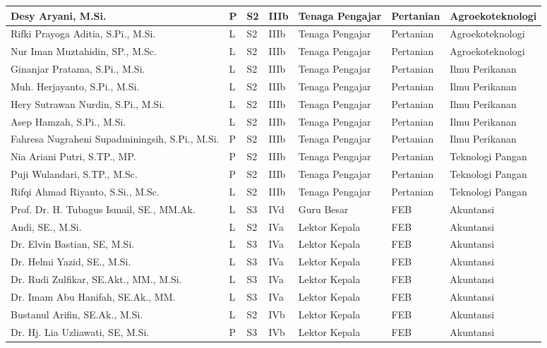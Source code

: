 \documentclass[
]{book}
\begin{document}
\begin{longtable}{l|l|l|l|l|l|l}
\hline
Desy Aryani, M.Si. & P & S2 & IIIb & Tenaga Pengajar & Pertanian & Agroekoteknologi\\
\hline
Rifki Prayoga Aditia, S.Pi., M.Si. & L & S2 & IIIb & Tenaga Pengajar & Pertanian & Agroekoteknologi\\
\hline
Nur Iman Muztahidin, SP., M.Sc. & L & S2 & IIIb & Tenaga Pengajar & Pertanian & Agroekoteknologi\\
\hline
Ginanjar Pratama, S.Pi., M.Si. & L & S2 & IIIb & Tenaga Pengajar & Pertanian & Ilmu Perikanan\\
\hline
Muh. Herjayanto, S.Pi., M.Si. & L & S2 & IIIb & Tenaga Pengajar & Pertanian & Ilmu Perikanan\\
\hline
Hery Sutrawan Nurdin, S.Pi., M.Si. & L & S2 & IIIb & Tenaga Pengajar & Pertanian & Ilmu Perikanan\\
\hline
Asep Hamzah, S.Pi., M.Si. & L & S2 & IIIb & Tenaga Pengajar & Pertanian & Ilmu Perikanan\\
\hline
Fahresa Nugraheni Supadminingsih, S.Pi., M.Si. & P & S2 & IIIb & Tenaga Pengajar & Pertanian & Ilmu Perikanan\\
\hline
Nia Ariani Putri, S.TP., MP. & P & S2 & IIIb & Tenaga Pengajar & Pertanian & Teknologi Pangan\\
\hline
Puji Wulandari, S.TP., M.Sc. & P & S2 & IIIb & Tenaga Pengajar & Pertanian & Teknologi Pangan\\
\hline
Rifqi Ahmad Riyanto, S.Si., M.Sc. & L & S2 & IIIb & Tenaga Pengajar & Pertanian & Teknologi Pangan\\
\hline
Prof. Dr. H. Tubagus Ismail, SE., MM.Ak. & L & S3 & IVd & Guru Besar & FEB & Akuntansi\\
\hline
Andi, SE., M.Si. & L & S2 & IVa & Lektor Kepala & FEB & Akuntansi\\
\hline
Dr. Elvin Bastian, SE, M.Si. & L & S3 & IVa & Lektor Kepala & FEB & Akuntansi\\
\hline
Dr. Helmi Yazid, SE., M.Si. & L & S3 & IVa & Lektor Kepala & FEB & Akuntansi\\
\hline
Dr. Rudi Zulfikar, SE.Akt., MM., M.Si. & L & S3 & IVa & Lektor Kepala & FEB & Akuntansi\\
\hline
Dr. Imam Abu Hanifah, SE.Ak., MM. & L & S3 & IVa & Lektor Kepala & FEB & Akuntansi\\
\hline
Bustanul Arifin, SE.Ak., M.Si. & L & S2 & IVb & Lektor Kepala & FEB & Akuntansi\\
\hline
Dr. Hj. Lia Uzliawati, SE, M.Si. & P & S3 & IVb & Lektor Kepala & FEB & Akuntansi\\

\end{longtable}
\end{document}
